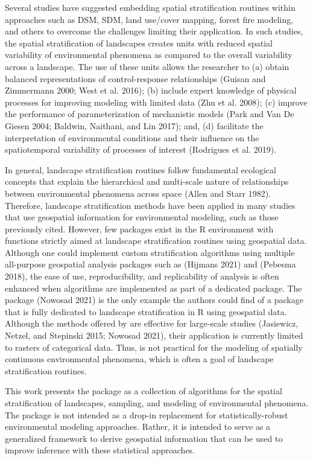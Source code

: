 Several studies have suggested embedding spatial stratification routines within
approaches such as DSM, SDM, land use/cover mapping, forest fire modeling, and
others to overcome the challenges limiting their application. In such studies,
the spatial stratification of landscapes creates units with reduced spatial
variability of environmental phenomena as compared to the overall variability
across a landscape. The use of these units allows the researcher to (a) obtain
balanced representations of control-response relationships (Guisan and Zimmermann 2000; West et al. 2016); (b) include expert knowledge of physical processes for improving
modeling with limited data (Zhu et al. 2008); (c) improve the performance of
parameterization of mechanistic models (Park and Van De Giesen 2004; Baldwin, Naithani, and Lin 2017); and, (d)
facilitate the interpretation of environmental conditions and their influence on
the spatiotemporal variability of processes of interest (Rodrigues et al. 2019).

In general, landscape stratification routines follow fundamental ecological
concepts that explain the hierarchical and multi-scale nature of relationships
between environmental phenomena across space (Allen and Starr 1982). Therefore, landscape
stratification methods have been applied in many studies that use geospatial
information for environmental modeling, such as those previously cited. However,
few packages exist in the R environment with functions strictly aimed at
landscape stratification routines using geospatial data. Although one could
implement custom stratification algorithms using multiple all-purpose geospatial
analysis packages such as  (Hijmans 2021) and 
(Pebesma 2018), the ease of use, reproducibility, and replicability of analysis
is often enhanced when algorithms are implemented as part of a dedicated
package. The  package (Nowosad 2021) is the only example the
authors could find of a package that is fully dedicated to landscape
stratification in R using geospatial data. Although the methods offered by
 are effective for large-scale studies (Jasiewicz, Netzel, and Stepinski 2015; Nowosad 2021), their application is currently limited to rasters of categorical
data. Thus,  is not practical for the modeling of spatially
continuous environmental phenomena, which is often a goal of landscape
stratification routines.

This work presents the  package as a collection of algorithms
for the spatial stratification of landscapes, sampling, and modeling of
environmental phenomena. The  package is not intended as a drop-in
replacement for statistically-robust environmental modeling approaches. Rather,
it is intended to serve as a generalized framework to derive geospatial
information that can be used to improve inference with these statistical
approaches.

